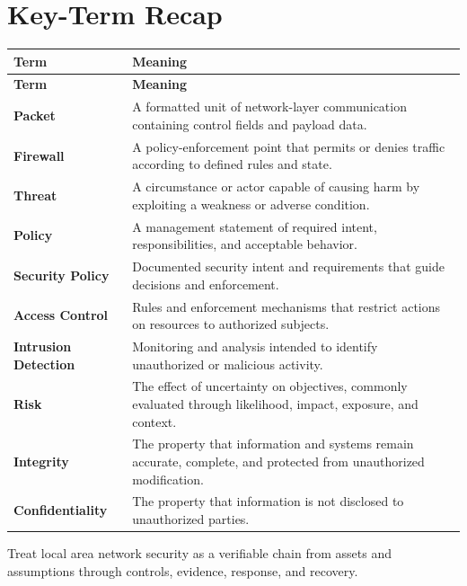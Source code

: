 \documentclass[11pt]{article}
\begin{document}
\section*{Key-Term Recap}
\begin{longtable}{>{\RaggedRight\arraybackslash}p{}>{\RaggedRight\arraybackslash}p{}}
\toprule\rowcolor{Navy}\color{white}\textbf{Term} & \color{white}\textbf{Meaning}\\\midrule
\endfirsthead
\toprule\rowcolor{Navy}\color{white}\textbf{Term} & \color{white}\textbf{Meaning}\\\midrule
\endhead
\textbf{Packet} & A formatted unit of network-layer communication containing control fields and payload data. \\\midrule
\textbf{Firewall} & A policy-enforcement point that permits or denies traffic according to defined rules and state. \\\midrule
\textbf{Threat} & A circumstance or actor capable of causing harm by exploiting a weakness or adverse condition. \\\midrule
\textbf{Policy} & A management statement of required intent, responsibilities, and acceptable behavior. \\\midrule
\textbf{Security Policy} & Documented security intent and requirements that guide decisions and enforcement. \\\midrule
\textbf{Access Control} & Rules and enforcement mechanisms that restrict actions on resources to authorized subjects. \\\midrule
\textbf{Intrusion Detection} & Monitoring and analysis intended to identify unauthorized or malicious activity. \\\midrule
\textbf{Risk} & The effect of uncertainty on objectives, commonly evaluated through likelihood, impact, exposure, and context. \\\midrule
\textbf{Integrity} & The property that information and systems remain accurate, complete, and protected from unauthorized modification. \\\midrule
\textbf{Confidentiality} & The property that information is not disclosed to unauthorized parties. \\\midrule
\bottomrule
\end{longtable}
\begin{takeawaybox}
Treat local area network security as a verifiable chain from assets and assumptions through controls, evidence, response, and recovery.
\end{takeawaybox}
\end{document}
